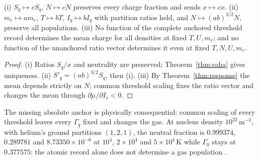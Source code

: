 \begin{theorem}\label{thm:scaling}
(i) $S_q\mapsto cS_q$, $N\mapsto cN$ preserves every charge fraction and sends $x\mapsto cx$. (ii) $m_e\mapsto am_e$, $T\mapsto bT$, $I_q\mapsto bI_q$ with partition ratios held, and $N\mapsto(ab)^{3/2}N$, preserve all populations. (iii) No function of the complete anchored threshold record determines the mean charge for all densities at fixed $T,U,m_e$; and no function of the unanchored ratio vector determines it even at fixed $T,N,U,m_e$. 
\end{theorem}
\begin{proof}
(i) Ratios $S_q/x$ and neutrality are preserved; Theorem~\ref{thm:saha} gives uniqueness. (ii) $S'_q=(ab)^{3/2}S_q$, then (i). (iii) By Theorem~\ref{thm:response} the mean depends strictly on $N$; common threshold scaling fixes the ratio vector and changes the mean through $\partial\mu/\partial I_r<0$.
\end{proof}
The missing absolute anchor is physically consequential: common scaling of every threshold leaves every $\Gamma_q$ fixed and changes the gas. At nucleus density $10^{22}\,\mathrm{m^{-3}}$, with helium's ground partitions $(1,2,1)$, the neutral fraction is $0.999374$, $0.289781$ and $8.73350\times10^{-6}$ at $10^4$, $2\times10^4$ and $5\times10^4$\,K while $\Gamma_0$ stays at $0.377575$: the atomic record alone does not determine a gas population .

